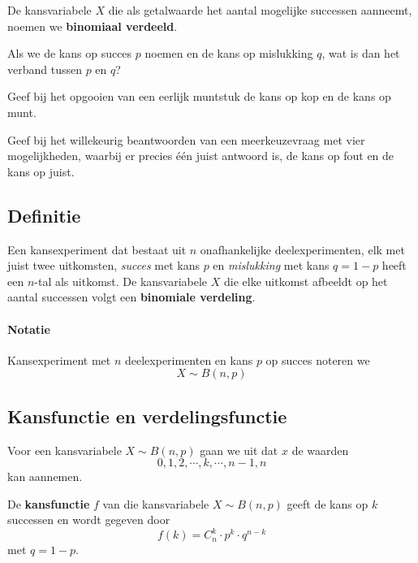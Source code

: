 \documentclass[a4paper,12pt, twoside]{article}
\begin{document}
De kansvariabele $X$ die als getalwaarde het aantal mogelijke successen aanneemt, noemen we {\bf binomiaal verdeeld}.

\begin{oefening}
  Als we de kans op succes $p$ noemen en de kans op mislukking $q$, wat is dan het verband tussen $p$ en $q$?
\end{oefening}
\begin{oefening}
  Geef bij het opgooien van een eerlijk muntstuk de kans op kop en de kans op munt.
\end{oefening}
\begin{oefening}
  Geef bij het willekeurig beantwoorden van een meerkeuzevraag met vier mogelijkheden, waarbij er precies één juist antwoord is, de kans op fout en de kans op juist.
\end{oefening}

\subsection{Definitie}

\begin{mdframed}
Een kansexperiment dat bestaat uit $n$ onafhankelijke deelexperimenten, elk met juist twee uitkomsten, {\em succes} met kans $p$ en {\em mislukking} met kans $q=1-p$ heeft een $n$-tal als uitkomst. De kansvariabele $X$ die elke uitkomst afbeeldt op het aantal successen volgt een {\bf binomiale verdeling}.
\end{mdframed}

\paragraph*{Notatie} Kansexperiment met $n$ deelexperimenten en kans $p$ op succes noteren we
$$X \sim B(n, p)$$

\subsection{Kansfunctie en verdelingsfunctie}


Voor een kansvariabele $X \sim B(n, p)$ gaan we uit dat $x$ de waarden $$0, 1, 2, \cdots, k, \cdots, n-1, n$$ kan aannemen.\\

\begin{mdframed}
De {\bf kansfunctie} $f$ van die kansvariabele $X \sim B(n, p)$ geeft de kans op $k$ successen en wordt gegeven door
$$ f(k)=C_n^k\cdot p^k\cdot q^{n-k}$$
met $q=1-p$.
\end{mdframed}
\vspace*{1cm}
\end{document}
